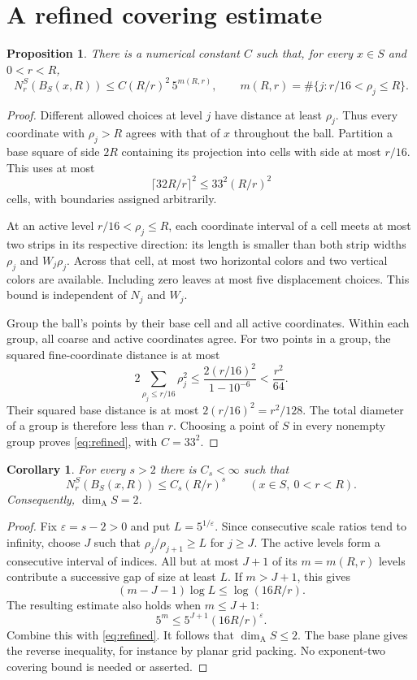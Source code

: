 \documentclass[11pt]{article}
\newtheorem{proposition}[theorem]{Proposition}
\newtheorem{corollary}[theorem]{Corollary}
\theoremstyle{remark}
\newcommand{\dimA}{\dim_{\mathrm A}}
\begin{document}
\section{A refined covering estimate}\label{sec:cover}
\begin{proposition}\label{prop:refined}
There is a numerical constant $C$ such that, for every $x\in S$ and $0<r<R$,
\begin{equation}\label{eq:refined}
 N_r^S(B_S(x,R))\le C(R/r)^2\,5^{m(R,r)},
 \qquad m(R,r)=\#\{j:r/16<\rho_j\le R\}.
\end{equation}
\end{proposition}
\begin{proof}
Different allowed choices at level $j$ have distance at least $\rho_j$. Thus every coordinate with $\rho_j>R$ agrees with that of $x$ throughout the ball. Partition a base square of side $2R$ containing its projection into cells with side at most $r/16$. This uses at most
\[
 \lceil32R/r\rceil^2\le 33^2(R/r)^2
\]
cells, with boundaries assigned arbitrarily.

At an active level $r/16<\rho_j\le R$, each coordinate interval of a cell meets at most two strips in its respective direction: its length is smaller than both strip widths $\rho_j$ and $W_j\rho_j$. Across that cell, at most two horizontal colors and two vertical colors are available. Including zero leaves at most five displacement choices. This bound is independent of $N_j$ and $W_j$.

Group the ball's points by their base cell and all active coordinates. Within each group, all coarse and active coordinates agree. For two points in a group, the squared fine-coordinate distance is at most
\[
 2\sum_{\rho_j\le r/16}\rho_j^2
 \le\frac{2(r/16)^2}{1-10^{-6}}<\frac{r^2}{64}.
\]
Their squared base distance is at most $2(r/16)^2=r^2/128$. The total diameter of a group is therefore less than $r$. Choosing a point of $S$ in every nonempty group proves \eqref{eq:refined}, with $C=33^2$.
\end{proof}

\begin{corollary}\label{cor:assouad-source}
For every $s>2$ there is $C_s<\infty$ such that
\begin{equation}\label{eq:s-source}
 N_r^S(B_S(x,R))\le C_s(R/r)^s\qquad(x\in S,\ 0<r<R).
\end{equation}
Consequently, $\dimA S=2$.
\end{corollary}
\begin{proof}
Fix $\varepsilon=s-2>0$ and put $L=5^{1/\varepsilon}$. Since consecutive scale ratios tend to infinity, choose $J$ such that $\rho_j/\rho_{j+1}\ge L$ for $j\ge J$. The active levels form a consecutive interval of indices. All but at most $J+1$ of its $m=m(R,r)$ levels contribute a successive gap of size at least $L$. If $m>J+1$, this gives
\[
 (m-J-1)\log L\le\log(16R/r).
\]
The resulting estimate also holds when $m\le J+1$:
\[
 5^m\le5^{J+1}(16R/r)^\varepsilon.
\]
Combine this with \eqref{eq:refined}. It follows that $\dimA S\le2$. The base plane gives the reverse inequality, for instance by planar grid packing. No exponent-two covering bound is needed or asserted.
\end{proof}
\end{document}
